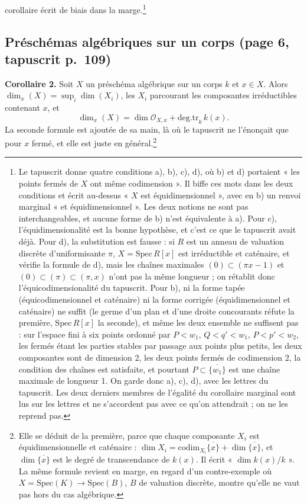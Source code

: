\documentclass[11pt,a4paper]{article}
\begin{document}
corollaire écrit de biais dans la marge.\footnote{Le tapuscrit donne quatre
conditions a), b), c), d), où b) et d) portaient « les points fermés de $X$
ont même codimension ». Il biffe ces mots dans les deux conditions et écrit
au-dessus « $X$ est équidimensionnel », avec en b) un renvoi marginal « et
équidimensionnel ». Les deux notions ne sont pas interchangeables, et aucune
forme de b) n'est équivalente à a). Pour c), l'équidimensionalité est la bonne
hypothèse, et c'est ce que le tapuscrit avait déjà. Pour d), la substitution
est fausse : si $R$ est un anneau de valuation discrète d'uniformisante $\pi$,
$X = \mathrm{Spec}\, R[x]$ est irréductible et caténaire, et vérifie la formule
de d), mais les chaînes maximales $(0) \subset (\pi x - 1)$ et
$(0) \subset (\pi) \subset (\pi, x)$ n'ont pas la même longueur ; on rétablit
donc l'équicodimensionalité du tapuscrit. Pour b), ni la forme tapée
(équicodimensionnel et caténaire) ni la forme corrigée (équidimensionnel et
caténaire) ne suffit (le germe d'un plan et d'une droite concourants
réfute la première, $\mathrm{Spec}\, R[x]$ la seconde), et même les deux
ensemble ne suffisent pas : sur l'espace fini à six points ordonné par
$P < w_{1}$, $Q < q' < w_{1}$, $P < p' < w_{2}$, les fermés étant les parties
stables par passage aux points plus petits, les deux composantes sont de
dimension 2, les deux points fermés de codimension 2, la condition des chaînes
est satisfaite, et pourtant $P \subset \overline{\{w_{1}\}}$ est une chaîne
maximale de longueur 1. On garde donc a), c), d), avec les lettres du
tapuscrit. Les deux derniers membres de l'égalité du corollaire marginal sont
lus sur les lettres et ne s'accordent pas avec ce qu'on attendrait ; on ne les
reprend pas.}

\subsection*{Préschémas algébriques sur un corps (page 6, tapuscrit p.~109)}

\textbf{Corollaire 2.} Soit $X$ un préschéma algébrique sur un corps $k$ et
$x \in X$. Alors $\dim_{x}(X) = \sup_{i} \dim(X_{i})$, les $X_{i}$ parcourant
les composantes irréductibles contenant $x$, et
\[
  \dim_{x}(X) = \dim \mathcal{O}_{X,x} + \mathrm{deg.tr}_{k}\, k(x).
\]
La seconde formule est ajoutée de sa main, là où le tapuscrit ne l'énonçait
que pour $x$ fermé, et elle est juste en général.\footnote{Elle se déduit de
la première, parce que chaque composante $X_{i}$ est équidimensionnelle et
caténaire : $\dim X_{i} = \mathrm{codim}_{X_{i}}\overline{\{x\}} +
\dim \overline{\{x\}}$, et $\dim \overline{\{x\}}$ est le degré de
transcendance de $k(x)$. Il écrit « $\dim k(x)/k$ ». La même formule revient
en marge, en regard d'un contre-exemple où $X = \mathrm{Spec}(K) \to
\mathrm{Spec}(B)$, $B$ de valuation discrète, montre qu'elle ne vaut pas hors
du cas algébrique.}
\end{document}

